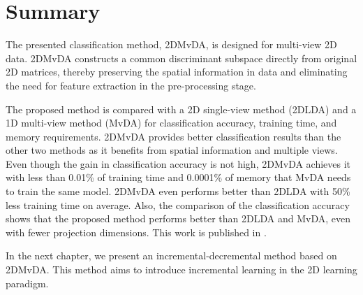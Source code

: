 \section{Summary}
\label{sec:2DMvDA_conc}
The presented classification method, 2DMvDA, is designed for multi-view 2D data. 2DMvDA constructs a common discriminant subspace directly from original 2D matrices, thereby preserving the spatial information in data and eliminating the need for feature extraction in the pre-processing stage.

The proposed method is compared with a 2D single-view method (2DLDA) and a 1D multi-view method (MvDA) for classification accuracy, training time, and memory requirements. 2DMvDA provides better classification results than the other two methods as it benefits from spatial information and multiple views. Even though the gain in classification accuracy is not high, 2DMvDA achieves it with less than 0.01\% of training time and 0.0001\% of memory that MvDA needs to train the same model. 2DMvDA even performs better than 2DLDA with 50\% less training time on average. Also, the comparison of the classification accuracy shows that the proposed method performs better than 2DLDA and MvDA, even with fewer projection dimensions. This work is published in \cite{ShivagundeS22}.

In the next chapter, we present an incremental-decremental method based on 2DMvDA. This method aims to introduce incremental learning in the 2D learning paradigm.

\chapterend
\cleardoublepage